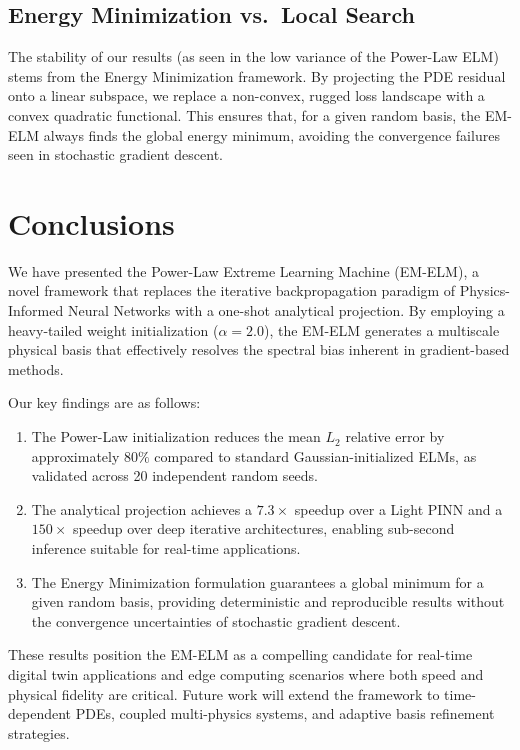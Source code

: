 \documentclass[final,12pt,3p,times,fleqn]{elsarticle}
\begin{document}
\subsection{Energy Minimization vs.\ Local Search}

The stability of our results (as seen in the low variance of the Power-Law ELM) stems from the Energy Minimization framework. By projecting the PDE residual onto a linear subspace, we replace a non-convex, rugged loss landscape with a convex quadratic functional. This ensures that, for a given random basis, the EM-ELM always finds the global energy minimum, avoiding the convergence failures seen in stochastic gradient descent.

\section{Conclusions}

We have presented the Power-Law Extreme Learning Machine (EM-ELM), a novel framework that replaces the iterative backpropagation paradigm of Physics-Informed Neural Networks with a one-shot analytical projection. By employing a heavy-tailed weight initialization ($\alpha=2.0$), the EM-ELM generates a multiscale physical basis that effectively resolves the spectral bias inherent in gradient-based methods.

Our key findings are as follows:
\begin{enumerate}
    \item The Power-Law initialization reduces the mean $L_2$ relative error by approximately $80\%$ compared to standard Gaussian-initialized ELMs, as validated across 20 independent random seeds.
    \item The analytical projection achieves a $7.3\times$ speedup over a Light PINN and a $150\times$ speedup over deep iterative architectures, enabling sub-second inference suitable for real-time applications.
    \item The Energy Minimization formulation guarantees a global minimum for a given random basis, providing deterministic and reproducible results without the convergence uncertainties of stochastic gradient descent.
\end{enumerate}

These results position the EM-ELM as a compelling candidate for real-time digital twin applications and edge computing scenarios where both speed and physical fidelity are critical. Future work will extend the framework to time-dependent PDEs, coupled multi-physics systems, and adaptive basis refinement strategies.


\nocite{*} 
 
\end{document}
